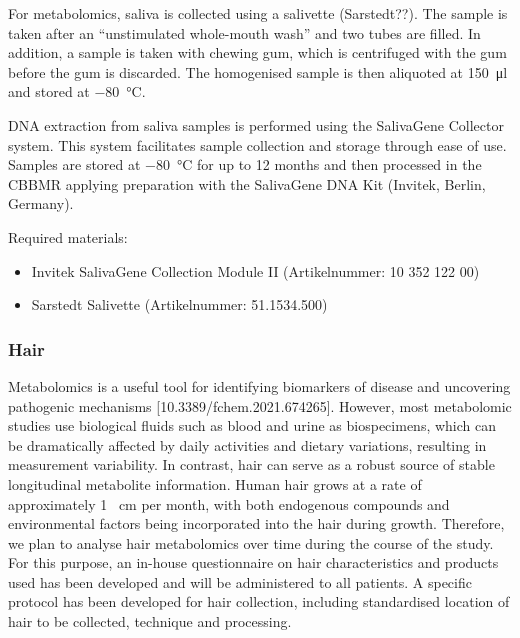 For metabolomics, saliva is collected using a salivette (Sarstedt??). The sample is taken after an ``unstimulated whole-mouth wash'' and two tubes are filled. In addition, a sample is taken with chewing gum, which is centrifuged with the gum before the gum is discarded.  The homogenised sample is then aliquoted at \SI[round-precision = 0, round-mode = places]{150}{\micro\litre} and stored at \SI[round-precision = 0, round-mode = places]{-80}{\degreeCelsius}.

DNA extraction from saliva samples is performed using the SalivaGene Collector system. This system facilitates sample collection and storage through ease of use. Samples are stored at \SI[round-precision = 0, round-mode = places]{-80}{\degreeCelsius} for up to \num[round-precision = 0, round-mode = places]{12} months and then processed in the \ac{CBBMR} applying preparation with the SalivaGene DNA Kit (Invitek, Berlin, Germany).

Required materials:
\begin{itemize}
\item Invitek SalivaGene Collection Module II (Artikelnummer: 10 352 122 00)
\item Sarstedt Salivette (Artikelnummer: 51.1534.500)
\end{itemize}

\subsubsection{Hair}
\label{biosamples:hair}
Metabolomics is a useful tool for identifying biomarkers of disease and uncovering pathogenic mechanisms [10.3389/fchem.2021.674265]. However, most metabolomic studies use biological fluids such as blood and urine as biospecimens, which can be dramatically affected by daily activities and dietary variations, resulting in measurement variability. In contrast, hair can serve as a robust source of stable longitudinal metabolite information. Human hair grows at a rate of approximately \num{1} \SI{}{\centi\metre} per month, with both endogenous compounds and environmental factors being incorporated into the hair during growth. Therefore, we plan to analyse hair metabolomics over time during the course of the study. For this purpose, an in-house questionnaire on hair characteristics and products used has been developed and will be administered to all patients. A specific protocol has been developed for hair collection, including standardised location of hair to be collected, technique and processing. 

